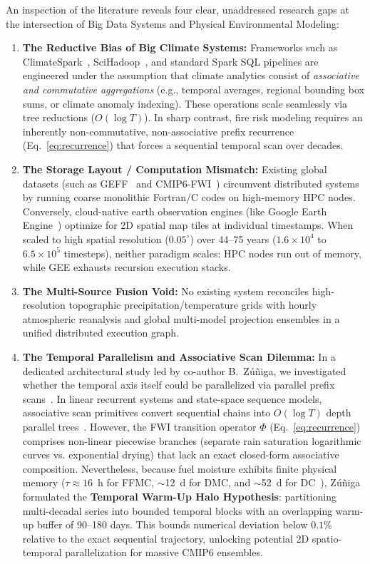 \documentclass[10pt,conference]{IEEEtran}
\begin{document}
An inspection of the literature reveals four clear, unaddressed research gaps at the intersection of Big Data Systems and Physical Environmental Modeling:
\begin{enumerate}
    \item \textbf{The Reductive Bias of Big Climate Systems:} Frameworks such as ClimateSpark~\cite{hu2018climatespark}, SciHadoop~\cite{li2016spatiotemporal}, and standard Spark SQL pipelines are engineered under the assumption that climate analytics consist of \textit{associative and commutative aggregations} (e.g., temporal averages, regional bounding box sums, or climate anomaly indexing). These operations scale seamlessly via tree reductions ($O(\log T)$). In sharp contrast, fire risk modeling requires an inherently non-commutative, non-associative prefix recurrence (Eq.~\ref{eq:recurrence}) that forces a sequential temporal scan over decades.
    \item \textbf{The Storage Layout / Computation Mismatch:} Existing global datasets (such as GEFF~\cite{vitolo2020era5} and CMIP6-FWI~\cite{quilcaille2023fire}) circumvent distributed systems by running coarse monolithic Fortran/C codes on high-memory HPC nodes. Conversely, cloud-native earth observation engines (like Google Earth Engine~\cite{gorelick2017google}) optimize for 2D spatial map tiles at individual timestamps. When scaled to high spatial resolution ($0.05^\circ$) over 44--75 years ($1.6 \times 10^4$ to $6.5 \times 10^5$ timesteps), neither paradigm scales: HPC nodes run out of memory, while GEE exhausts recursion execution stacks.
    \item \textbf{The Multi-Source Fusion Void:} No existing system reconciles high-resolution topographic precipitation/temperature grids with hourly atmospheric reanalysis and global multi-model projection ensembles in a unified distributed execution graph.
    \item \textbf{The Temporal Parallelism and Associative Scan Dilemma:} In a dedicated architectural study led by co-author B.~Z\'u\~niga, we investigated whether the temporal axis itself could be parallelized via parallel prefix scans~\cite{blelloch1990prefix}. In linear recurrent systems and state-space sequence models, associative scan primitives convert sequential chains into $O(\log T)$ depth parallel trees~\cite{martin2018parallelizing, sarkka2021temporal}. However, the FWI transition operator $\Phi$ (Eq.~\ref{eq:recurrence}) comprises non-linear piecewise branches (separate rain saturation logarithmic curves vs. exponential drying) that lack an exact closed-form associative composition. Nevertheless, because fuel moisture exhibits finite physical memory ($\tau \approx 16$~h for FFMC, $\sim$12~d for DMC, and $\sim$52~d for DC~\cite{vanwagner1987development, mcelhinny2020high}), Z\'u\~niga formulated the \textbf{Temporal Warm-Up Halo Hypothesis}: partitioning multi-decadal series into bounded temporal blocks with an overlapping warm-up buffer of 90--180 days. This bounds numerical deviation below $0.1\%$ relative to the exact sequential trajectory, unlocking potential 2D spatio-temporal parallelization for massive CMIP6 ensembles.
\end{enumerate}
\end{document}
